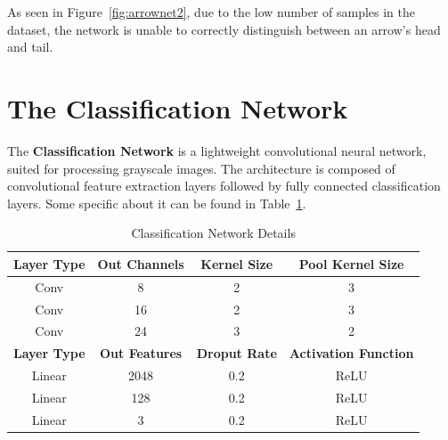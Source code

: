 \documentclass[conference]{IEEEtran}
\begin{document}
\begin{appendices}
As seen in Figure~\ref{fig:arrownet2}, due to the low number of samples in the dataset, the network is unable to correctly distinguish between an arrow's head and tail.

\section{The Classification Network}
\label{classification_net}

The \textbf{Classification Network} is a lightweight convolutional neural network, suited for processing grayscale images. The architecture is composed of convolutional feature extraction layers followed by fully connected classification layers. Some specific about it can be found in Table~\ref{tab:classification-architecture}.

\begin{table}[h]
	\centering
	\caption{Classification Network Details}
	\label{tab:classification-architecture}
	\begin{tabular}{|c|c|c|c|}
		\hline
		\textbf{Layer Type} & \textbf{Out Channels} & \textbf{Kernel Size} & \textbf{Pool Kernel Size} \\
		\hline 
		Conv & 8 & 2 & 3 \\
		Conv & 16 & 2  & 3 \\
		Conv & 24 & 3  & 2 \\
		\hline
		\textbf{Layer Type} & \textbf{Out Features} & \textbf{Droput Rate} & \textbf{Activation Function} \\
		\hline 
		Linear & 2048 & 0.2 & ReLU \\
		Linear & 128 & 0.2 & ReLU \\
		Linear & 3 & 0.2 & ReLU \\
		\hline
	\end{tabular}
\end{table}

\end{appendices}
\end{document}
